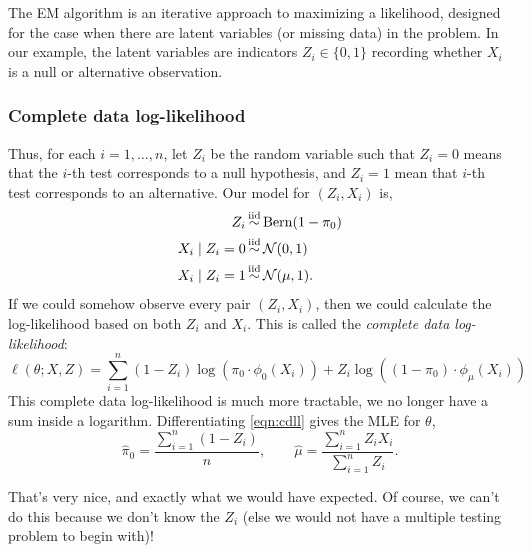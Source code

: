 The EM algorithm is an iterative approach to maximizing a likelihood, designed for the case when there are latent variables (or missing data) in the problem. In our example, the latent variables are indicators $Z_i \in \{0,1\}$ recording whether $X_i$ is a null or alternative observation. 

\subsubsection*{Complete data log-likelihood}
Thus, for each $i = 1, \dots, n$, let $Z_i$ be the random variable such that $Z_i = 0$ means that the $i$-th test corresponds to a null hypothesis, and $Z_i = 1$ mean that $i$-th test corresponds to an alternative. Our model for $(Z_i,X_i)$ is,
\begin{align*}
    Z_i & \simiid \mathrm{Bern}(1-\pi_0)\\
    X_i \mid Z_i = 0 &\simiid \nn(0,1)\\
     X_i \mid Z_i = 1 &\simiid \nn(\mu,1).
\end{align*}
If we could somehow observe every pair $(Z_i,X_i)$, then we could calculate the log-likelihood based on both $Z_i$ and $X_i$. This is called the \emph{complete data log-likelihood}:
\begin{equation}
\label{eqn:cdll}
\ell(\theta; X, Z) = \sum_{i=1}^n  (1-Z_i) \log(\pi_0 \cdot \phi_{0}(X_i)) + Z_i \log((1 - \pi_0) \cdot \phi_{\mu}(X_i))
\end{equation}
This complete data log-likelihood is much more tractable, we no longer have a sum inside a logarithm. Differentiating \eqref{eqn:cdll} gives the MLE for $\theta$,
\[ \widehat{\pi}_0 = \frac{\sum_{i=1}^n (1-Z_i)}{n}, \qquad \hat{\mu} = \frac{\sum_{i=1}^n Z_i X_i}{\sum_{i=1}^n Z_i}. \]

That's very nice, and exactly what we would have expected. Of course, we can't do this because we don't know the $Z_i$ (else we would not have a multiple testing problem to begin with)!


